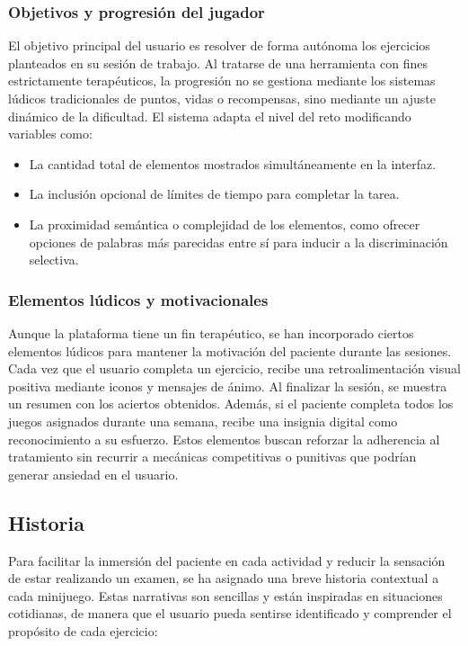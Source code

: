 \subsubsection{Objetivos y progresión del jugador}
El objetivo principal del usuario es resolver de forma autónoma los ejercicios planteados en su sesión de trabajo. Al tratarse de una herramienta con fines estrictamente terapéuticos, la progresión no se gestiona mediante los sistemas lúdicos tradicionales de puntos, vidas o recompensas, sino mediante un ajuste dinámico de la dificultad. El sistema adapta el nivel del reto modificando variables como:
\begin{itemize}
    \item La cantidad total de elementos mostrados simultáneamente en la interfaz.
    \item La inclusión opcional de límites de tiempo para completar la tarea.
    \item La proximidad semántica o complejidad de los elementos, como ofrecer opciones de palabras más parecidas entre sí para inducir a la discriminación selectiva.
\end{itemize}

\subsubsection{Elementos lúdicos y motivacionales}
Aunque la plataforma tiene un fin terapéutico, se han incorporado ciertos elementos lúdicos para mantener la motivación del paciente durante las sesiones. Cada vez que el usuario completa un ejercicio, recibe una retroalimentación visual positiva mediante iconos y mensajes de ánimo. Al finalizar la sesión, se muestra un resumen con los aciertos obtenidos. Además, si el paciente completa todos los juegos asignados durante una semana, recibe una insignia digital como reconocimiento a su esfuerzo. Estos elementos buscan reforzar la adherencia al tratamiento sin recurrir a mecánicas competitivas o punitivas que podrían generar ansiedad en el usuario.

\subsection{Historia}
Para facilitar la inmersión del paciente en cada actividad y reducir la sensación de estar realizando un examen, se ha asignado una breve historia contextual a cada minijuego. Estas narrativas son sencillas y están inspiradas en situaciones cotidianas, de manera que el usuario pueda sentirse identificado y comprender el propósito de cada ejercicio:

